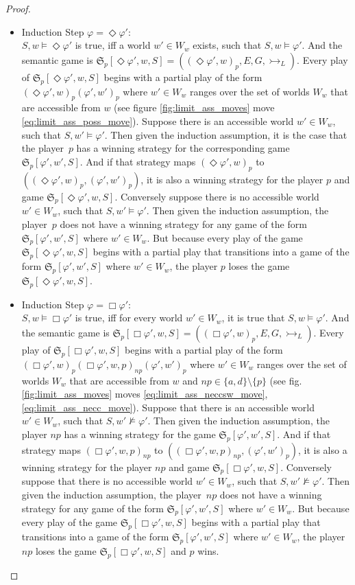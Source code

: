 \documentclass[a4paper,american]{paper}
\theoremstyle{definition}\newtheorem{definition}{Definition}
\begin{document}
\begin{proof}
\begin{itemize}
\item Induction Step $\varphi=\Diamond\varphi'$:\\
$S,w\vDash\Diamond\varphi'$ is true, iff a world $w'\in W_w$ exists, such that $S,w\vDash\varphi'$. And the semantic game is $\mathfrak{S}_p[\Diamond\varphi',w,S]=((\Diamond\varphi' ,w)_p, E, G, \rightarrowtail_L)$. Every play of $\mathfrak{S}_p[\Diamond\varphi',w,S]$ begins with a partial play of the form $(\Diamond\varphi' ,w)_p(\varphi' ,w')_p$ where $w'\in W_w$ ranges over the set of worlds $W_w$ that are accessible from $w$ (see figure \ref{fig:limit_ass_moves} move \ref{eq:limit_ass_poss_move}). Suppose there is an accessible world $w'\in W_w$, such that $S,w'\vDash\varphi'$. Then given the induction assumption, it is the case that the player~$p$ has a winning strategy for the corresponding game $\mathfrak{S}_{p}[\varphi' ,w',S]$. And if that strategy maps $(\Diamond\varphi' ,w)_p$ to $((\Diamond\varphi' ,w)_p,(\varphi' ,w')_p)$, it is also a winning strategy for the player $p$ and game $\mathfrak{S}_p[\Diamond\varphi',w,S]$. Conversely suppose there is no accessible world $w'\in W_w$, such that $S,w'\vDash\varphi'$. Then given the induction assumption, the player~$p$ does not have a winning strategy for any game of the form $\mathfrak{S}_{p}[\varphi' ,w',S]$ where $w'\in W_w$. But because every play of the game $\mathfrak{S}_p[\Diamond\varphi',w,S]$ begins with a partial play that transitions into a game of the form $\mathfrak{S}_{p}[\varphi' ,w',S]$ where $w'\in W_w$, the player $p$ loses the game $\mathfrak{S}_p[\Diamond\varphi',w,S]$.

\item Induction Step $\varphi=\Box\varphi'$:\\
$S,w\vDash\Box\varphi'$ is true, iff for every world $w'\in W_w$, it is true that $S,w\vDash\varphi'$. And the semantic game is $\mathfrak{S}_p[\Box\varphi',w,S]=((\Box\varphi' ,w)_p, E, G, \rightarrowtail_L)$. Every play of $\mathfrak{S}_p[\Box\varphi',w,S]$ begins with a partial play of the form $(\Box\varphi' ,w)_p(\Box\varphi' ,w,p)_{np}(\varphi' ,w')_p$ where $w'\in W_w$ ranges over the set of worlds $W_w$ that are accessible from $w$ and $np\in\{a,d\}\setminus{}\{p\}$ (see fig. \ref{fig:limit_ass_moves} moves \ref{eq:limit_ass_neccsw_move},\ref{eq:limit_ass_necc_move}). Suppose that there is an accessible world $w'\in W_w$, such that $S,w'\nvDash\varphi'$. Then given the induction assumption, the player $np$ has a winning strategy for the game $\mathfrak{S}_p[\varphi',w',S]$. And if that strategy maps $(\Box\varphi' ,w,p)_{np}$ to $((\Box\varphi' ,w,p)_{np},(\varphi' ,w')_p)$, it is also a winning strategy for the player $np$ and game $\mathfrak{S}_p[\Box\varphi',w,S]$. Conversely suppose that there is no accessible world $w'\in W_w$, such that $S,w'\nvDash\varphi'$. Then given the induction assumption, the player~$np$ does not have a winning strategy for any game of the form $\mathfrak{S}_{p}[\varphi' ,w',S]$ where $w'\in W_w$. But because every play of the game $\mathfrak{S}_p[\Box\varphi',w,S]$ begins with a partial play that transitions into a game of the form $\mathfrak{S}_{p}[\varphi' ,w',S]$ where $w'\in W_w$, the player $np$ loses the game $\mathfrak{S}_p[\Box\varphi',w,S]$ and $p$ wins.


\end{itemize}
\end{proof}
\end{document}
